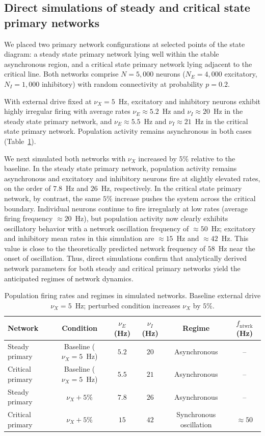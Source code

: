 \documentclass[11pt]{article}
\begin{document}
\subsection{Direct simulations of steady and critical state primary networks}

We placed two primary network configurations at selected points of the state diagram: a steady state primary network lying well within the stable asynchronous region, and a critical state primary network lying adjacent to the critical line. Both networks comprise $N = 5{,}000$ neurons ($N_E = 4{,}000$ excitatory, $N_I = 1{,}000$ inhibitory) with random connectivity at probability $p = 0.2$.

With external drive fixed at $\nu_X = 5$~Hz, excitatory and inhibitory neurons exhibit highly irregular firing with average rates $\nu_E \approx 5.2$~Hz and $\nu_I \approx 20$~Hz in the steady state primary network, and $\nu_E \approx 5.5$~Hz and $\nu_I \approx 21$~Hz in the critical state primary network. Population activity remains asynchronous in both cases (Table~\ref{tab:firing}).

We next simulated both networks with $\nu_X$ increased by $5\%$ relative to the baseline. In the steady state primary network, population activity remains asynchronous and excitatory and inhibitory neurons fire at slightly elevated rates, on the order of $7.8$~Hz and $26$~Hz, respectively. In the critical state primary network, by contrast, the same $5\%$ increase pushes the system across the critical boundary. Individual neurons continue to fire irregularly at low rates (average firing frequency $\approx 20$~Hz), but population activity now clearly exhibits oscillatory behavior with a network oscillation frequency of $\approx 50$~Hz; excitatory and inhibitory mean rates in this simulation are $\approx 15$~Hz and $\approx 42$~Hz. This value is close to the theoretically predicted network frequency of $58$~Hz near the onset of oscillation. Thus, direct simulations confirm that analytically derived network parameters for both steady and critical primary networks yield the anticipated regimes of network dynamics.

\begin{table}[ht]
\centering
\caption{Population firing rates and regimes in simulated networks. Baseline external drive $\nu_X = 5$~Hz; perturbed condition increases $\nu_X$ by $5\%$.}
\label{tab:firing}
\begin{tabular}{lccccc}
\toprule
Network & Condition & $\nu_E$ (Hz) & $\nu_I$ (Hz) & Regime & $f_{\mathrm{ntwrk}}$ (Hz) \\
\midrule
Steady primary  & Baseline ($\nu_X = 5$~Hz)   & $5.2$ & $20$ & Asynchronous & -- \\
Critical primary & Baseline ($\nu_X = 5$~Hz)  & $5.5$ & $21$ & Asynchronous & -- \\
Steady primary  & $\nu_X + 5\%$              & $7.8$ & $26$ & Asynchronous & -- \\
Critical primary & $\nu_X + 5\%$             & $15$  & $42$ & Synchronous oscillation & $\approx 50$ \\
\bottomrule
\end{tabular}
\end{table}
\end{document}
